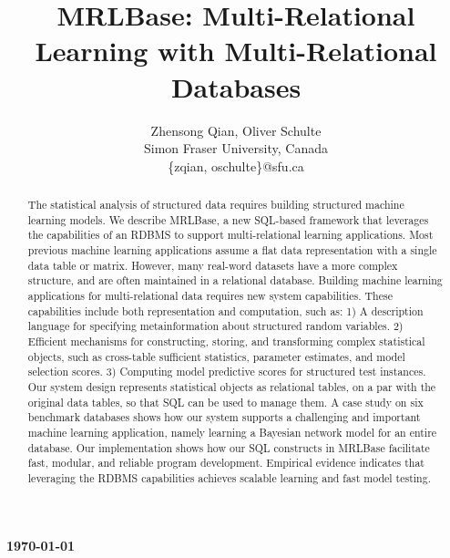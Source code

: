 \documentclass{acm_proc_article-sp}
\begin{document}
\title{MRLBase: Multi-Relational Learning with Multi-Relational Databases}
\author{
Zhensong Qian, Oliver Schulte\\
 Simon Fraser University, Canada\\
\{zqian, oschulte\}@sfu.ca
}

\maketitle  
\textbf{\today}
\begin{abstract} 
The statistical analysis of structured data requires building structured machine learning models. We describe MRLBase, a new SQL-based framework that leverages the capabilities of an RDBMS to support multi-relational learning applications. Most previous machine learning applications assume a flat data representation with a single data table or matrix. However, many real-word datasets have a more complex structure, and are often maintained in a relational database.
Building machine learning applications for multi-relational data requires new system capabilities. These capabilities include both representation and computation, such as: 1) A description language for specifying metainformation about structured random variables. 2) Efficient mechanisms for constructing, storing, and transforming complex statistical objects, such as cross-table sufficient statistics, parameter estimates, and model selection scores. 3) Computing model predictive scores for structured test instances. Our system design represents statistical objects as  relational tables, on a par with the original data tables, so that SQL can be used  to manage them. A case study on six benchmark databases shows how our system supports a challenging and important machine learning application, namely learning a Bayesian network model for an entire database. Our implementation shows how our SQL constructs in MRLBase facilitate fast, modular, and reliable program development. Empirical evidence indicates that leveraging the RDBMS capabilities  achieves scalable learning and fast model testing.
\end{abstract}
%
%
%
%
\end{document}
